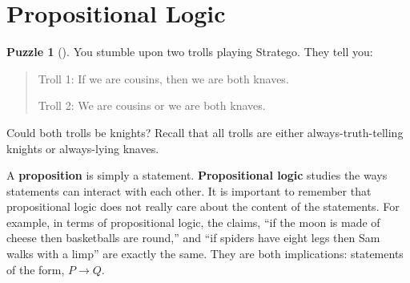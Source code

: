 \documentclass[10pt,]{book}
\newcommand{\terminology}[1]{\textbf{#1}}
\theoremstyle{plain}
\theoremstyle{definition}
\theoremstyle{definition}
\theoremstyle{definition}
\newtheorem{investigation}[project]{Puzzle}
\numberwithin{equation}{chapter}
\def\imp{\rightarrow}
\begin{document}
\section[{Propositional Logic}]{Propositional Logic}\label{sec_background-logic}
\begin{investigation}[]\label{investigation-11}
\hypertarget{p-2275}{}%
You stumble upon two trolls playing Stratego\textregistered{}.  They tell you:%
\begin{quote}\hypertarget{blockquote-9}{}
\hypertarget{p-2276}{}%
Troll 1: If we are cousins, then we are both knaves.%
\par
\hypertarget{p-2277}{}%
Troll 2: We are cousins or we are both knaves.%
\end{quote}
\hypertarget{p-2278}{}%
Could both trolls be knights?  Recall that all trolls are either always-truth-telling knights or always-lying knaves.%
\end{investigation}
\hypertarget{p-2279}{}%
A \terminology{proposition} is simply a statement. \terminology{Propositional logic} studies the ways statements can interact with each other. It is important to remember that propositional logic does not really care about the content of the statements. For example, in terms of propositional logic, the claims, ``if the moon is made of cheese then basketballs are round,'' and ``if spiders have eight legs then Sam walks with a limp'' are exactly the same. They are both implications: statements of the form, \(P \imp Q\).%
\typeout{************************************************}
\typeout{************************************************}
\end{document}
